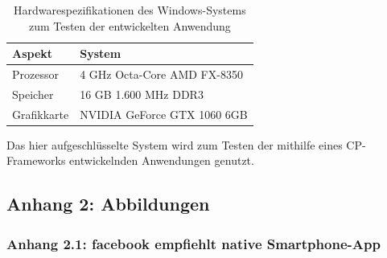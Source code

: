 \documentclass[a4paper]{scrartcl}
\begin{document}
\begin{table}[H]
	\centering
	\caption{Hardwarespezifikationen des Windows-Systems zum Testen der entwickelten Anwendung}
	\begin{center}
		\begin{tabularx}{\linewidth}{| l | X |}
			\hline
			Aspekt & System \\ 
			\hline \hline
			Prozessor & 4 GHz Octa-Core AMD FX-8350 \\
			\hline
			Speicher & 16 GB 1.600 MHz DDR3 \\
			\hline
			Grafikkarte & NVIDIA GeForce GTX 1060 6GB \\
			\hline
		\end{tabularx}
	\end{center}
	Das hier aufgeschlüsselte System wird zum Testen der mithilfe eines CP-Frameworks entwickelnden Anwendungen genutzt.
\end{table}

\newpage

\subsection*{Anhang 2: Abbildungen}

\subsubsection*{Anhang 2.1: facebook empfiehlt native Smartphone-App}
\end{document}
